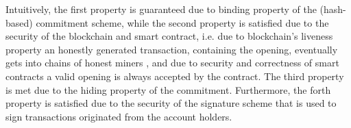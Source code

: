 %
%
%  
 
 
 Intuitively, the first property is guaranteed due to binding property of the (hash-based) commitment scheme, while the second property is satisfied due to the security of the blockchain and smart contract, i.e. due to blockchain's liveness property an honestly generated transaction, containing the opening,  eventually gets into  chains of honest miners \cite{GarayKL15}, and due to   security and correctness of smart contracts a valid opening is always accepted by the contract. The third property is met due to the hiding property of the commitment.  Furthermore, the forth property is satisfied due to the security of the signature scheme that is used to sign  transactions originated from the account holders. 
 

